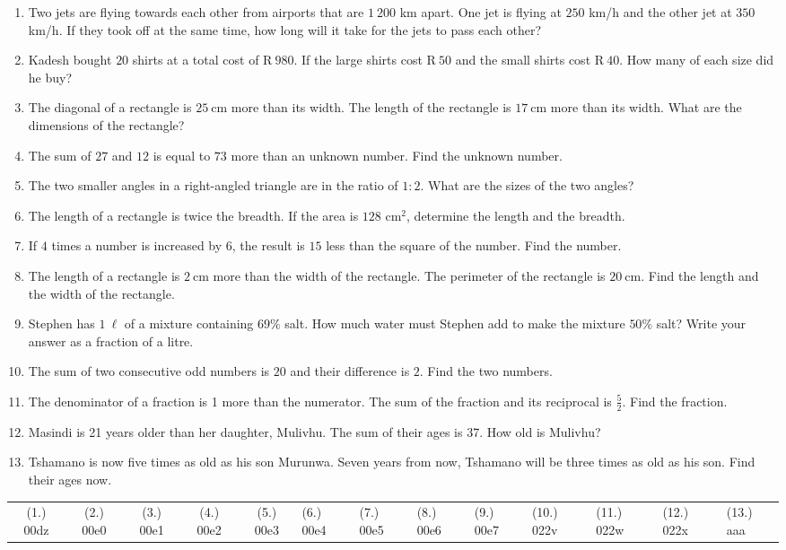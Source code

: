 \begin{exercises}{}
{
\begin{enumerate}[noitemsep, label=\textbf{\arabic*}. ] 
\item Two jets are flying towards each other from airports that are $1~200$ km apart. One jet is flying at $250$ km/h and the other jet at $350$ km/h. If they took off at the same time, how long will it take for the jets to pass each other?
\item Kadesh bought $20$ shirts at a total cost of R$~980$. If the
  large shirts cost R$~50$ and the small shirts cost R$~40$. How many
  of each size did he buy?
\item The diagonal of a rectangle is $25~$cm more than its width. The length of the rectangle is $17~$cm more than its width. What are the dimensions of the rectangle?  
\item The sum of $27$ and $12$ is equal to $73$ more than an unknown number. Find the unknown number.
\item The two smaller angles in a right-angled triangle are in the ratio of $1:2$. What are the sizes of the two angles? 
\item The length of a rectangle is twice the breadth. If the area is $128$ cm$^{2}$, determine the length and the breadth.       
\item If $4$ times a number is increased by $6$, the result is $15$ less than the square of the number. Find the number.
\item The length of a rectangle is $2~$cm more than the width of the rectangle. The perimeter of the rectangle is $20~$cm. Find the length and the width of the rectangle.
\item Stephen has $1~\ell{}$ of a mixture containing $69\%$ salt. How much water must Stephen add to make the mixture $50\%$ salt? Write your answer as a fraction of a litre.
\item The sum of two consecutive odd numbers is $20$ and their difference is $2$. Find the two numbers. 
\item The denominator of a fraction is 1 more than the numerator. The sum of the fraction and its reciprocal is $\frac{5}{2}$. Find the fraction.
\item Masindi is 21 years older than her daughter, Mulivhu. The sum of their ages is 37. How old is Mulivhu? 
\item Tshamano is now five times as old as his son Murunwa. Seven years from now, Tshamano will be three times as old as his son. Find their ages now.    
\end{enumerate}
\practiceinfo
\par 
\par \begin{tabular}[h]{ccccc}
(1.) 00dz&  (2.) 00e0&  (3.) 00e1&  (4.) 00e2&  (5.) 00e3&  (6.) 00e4&  (7.) 00e5& (8.) 00e6& (9.) 00e7 & (10.) 022v & (11.) 022w & (12.) 022x & (13.) aaa\end{tabular}
}
\end{exercises}

